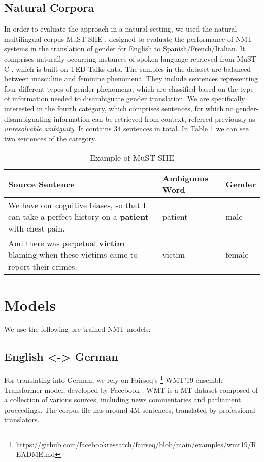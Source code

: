 \subsection{Natural Corpora}
\label{sec:Experiments:Natural_Corpora}

In order to evaluate the approach in a natural setting, we used the natural multilingual corpus MuST-SHE \parencite{MuST-SHE}, designed to evaluate the performance of NMT systems in the translation of gender for English to Spanish/French/Italian. It comprises naturally occurring instances of spoken language retrieved from MuST-C \parencite{MuST-C}, which is built on TED Talks data. The samples in the dataset are balanced between masculine and feminine phenomena. They include sentences representing four different types of gender phenomena, which are classified based
on the type of information needed to disambiguate gender translation. We are specifically interested in the fourth category, which comprises sentences, for which no gender-disambiguating information can be retrieved from context, referred previously as \textit{unresolvable ambiguity}. It contains 34 sentences in total. In Table \ref{tab:mustshe} we can see two sentences of the category. 

\begin{table}
    \caption{Example of MuST-SHE}
    \label{tab:mustshe}
    \begin{tabularx}{\linewidth}{|X|l|l|}
        \hline
        \textbf{Source Sentence} & \textbf{Ambiguous Word} & \textbf{Gender} \\ \hline
        We have our cognitive biases, so that I can take a perfect history on a \textbf{patient} with chest pain. & patient & male \\ \hline
        And there was perpetual \textbf{victim} blaming when these victims came to report their crimes. & victim & female \\ \hline
    \end{tabularx}
\end{table}

\section{Models}
\label{sec:Experiments:Models}

We use the following pre-trained NMT models:

\subsection{English <-> German}
For translating into German, we rely on Fairseq's \footnote{https://github.com/facebookresearch/fairseq/blob/main/examples/wmt19/README.md} WMT’19 ensemble Transformer model, developed by Facebook \parencite{WMT19}. WMT is a MT dataset composed of a collection of various sources, including news commentaries and parliament proceedings. The corpus file has around 4M sentences, translated by professional translators.


